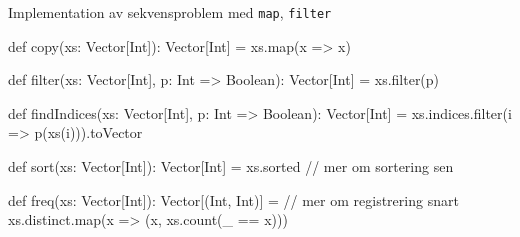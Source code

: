 \begin{Slide}{Implementation av sekvensproblem med \texttt{map}, \texttt{filter}}
\begin{Code}
def copy(xs: Vector[Int]): Vector[Int] = xs.map(x => x)

def filter(xs: Vector[Int], p: Int => Boolean): Vector[Int] = xs.filter(p)

def findIndices(xs: Vector[Int], p: Int => Boolean): Vector[Int] =
  xs.indices.filter(i => p(xs(i))).toVector

def sort(xs: Vector[Int]): Vector[Int] = xs.sorted // mer om sortering sen

def freq(xs: Vector[Int]): Vector[(Int, Int)] = // mer om registrering snart
  xs.distinct.map(x => (x, xs.count(_ == x)))
\end{Code}
\end{Slide}


